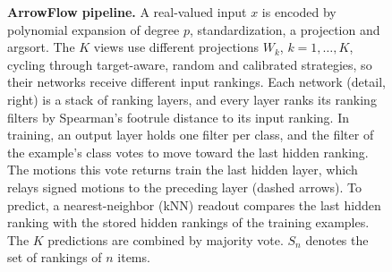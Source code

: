 \begin{figure}[!htbp]
{%
}
\caption{\textbf{ArrowFlow pipeline.} A real-valued input $x$ is encoded by polynomial expansion of degree $p$, standardization, a projection and argsort. The $K$ views use different projections $W_k$, $k = 1, \dots, K$, cycling through target-aware, random and calibrated strategies, so their networks receive different input rankings. Each network (detail, right) is a stack of ranking layers, and every layer ranks its ranking filters by Spearman's footrule distance to its input ranking. In training, an output layer holds one filter per class, and the filter of the example's class votes to move toward the last hidden ranking. The motions this vote returns train the last hidden layer, which relays signed motions to the preceding layer (dashed arrows). To predict, a nearest-neighbor (kNN) readout compares the last hidden ranking with the stored hidden rankings of the training examples. The $K$ predictions are combined by majority vote. $S_n$ denotes the set of rankings of $n$ items.}
\label{fig:pipeline}
\end{figure}
